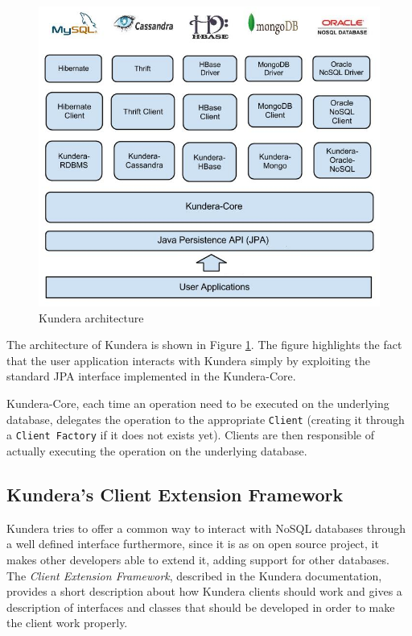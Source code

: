 \begin{figure}[tbh]
  \centering
  \includegraphics[scale=0.5]{images/kundera_architecture}
  \caption{Kundera architecture}
  \label{fig:kundera_architecture}
\end{figure}

\noindent The architecture of Kundera is shown in Figure \ref{fig:kundera_architecture}. The figure highlights the fact that the user application interacts with Kundera simply by exploiting the standard JPA interface implemented in the Kundera-Core.

\noindent Kundera-Core, each time an operation need to be executed on the underlying database, delegates the operation to the appropriate \texttt{Client} (creating it through a \texttt{Client Factory} if it does not exists yet). Clients are then responsible of actually executing the operation on the underlying database.

\subsection{Kundera's Client Extension Framework}
Kundera tries to offer a common way to interact with NoSQL databases through a well defined interface furthermore, since it is as on open source project, it makes other developers able to extend it, adding support for other databases.
The \textit{Client Extension Framework}, described in the Kundera documentation, provides a short description about how Kundera clients should work and gives a description of interfaces and classes that should be developed in order to make the client work properly.

